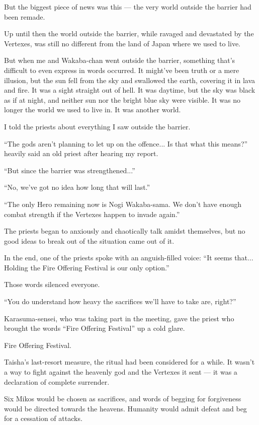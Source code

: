 But the biggest piece of news was this --- the very world outside the barrier had been remade.

Up until then the world outside the barrier, while ravaged and devastated by the Vertexes, was still no different from the land of Japan where we used to live.

But when me and Wakaba-chan went outside the barrier, something that's difficult to even express in words occurred. It might've been truth or a mere illusion, but the sun fell from the sky and swallowed the earth, covering it in lava and fire. It was a sight straight out of hell. It was daytime, but the sky was black as if at night, and neither sun nor the bright blue sky were visible. It was no longer the world we used to live in. It was another world.

I told the priests about everything I saw outside the barrier.

``The gods aren't planning to let up on the offence... Is that what this means?'' heavily said an old priest after hearing my report.

``But since the barrier was strengthened...''

``No, we've got no idea how long that will last.''

``The only Hero remaining now is Nogi Wakaba-sama. We don't have enough combat strength if the Vertexes happen to invade again.''

The priests began to anxiously and chaotically talk amidst themselves, but no good ideas to break out of the situation came out of it.

In the end, one of the priests spoke with an anguish-filled voice: ``It seems that... Holding the Fire Offering Festival is our only option.''

Those words silenced everyone.

``You do understand how heavy the sacrifices we'll have to take are, right?''

Karasuma-sensei, who was taking part in the meeting, gave the priest who brought the words ``Fire Offering Festival'' up a cold glare.

Fire Offering Festival.

Taisha's last-resort measure, the ritual had been considered for a while. It wasn't a way to fight against the heavenly god and the Vertexes it sent --- it was a declaration of complete surrender.

Six Mikos would be chosen as sacrifices, and words of begging for forgiveness would be directed towards the heavens. Humanity would admit defeat and beg for a cessation of attacks.

